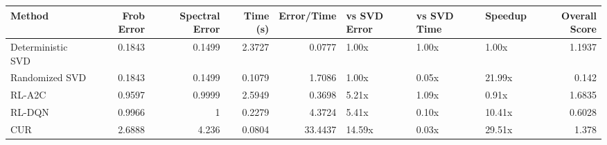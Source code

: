 \begin{tabular}{lrrrrlllr}
\hline
 Method            &   Frob Error &   Spectral Error &   Time (s) &   Error/Time & vs SVD Error   & vs SVD Time   & Speedup   &   Overall Score \\
\hline
 Deterministic SVD &       0.1843 &           0.1499 &     2.3727 &       0.0777 & 1.00x          & 1.00x         & 1.00x     &          1.1937 \\
 Randomized SVD    &       0.1843 &           0.1499 &     0.1079 &       1.7086 & 1.00x          & 0.05x         & 21.99x    &          0.142  \\
 RL-A2C            &       0.9597 &           0.9999 &     2.5949 &       0.3698 & 5.21x          & 1.09x         & 0.91x     &          1.6835 \\
 RL-DQN            &       0.9966 &           1      &     0.2279 &       4.3724 & 5.41x          & 0.10x         & 10.41x    &          0.6028 \\
 CUR               &       2.6888 &           4.236  &     0.0804 &      33.4437 & 14.59x         & 0.03x         & 29.51x    &          1.378  \\
\hline
\end{tabular}